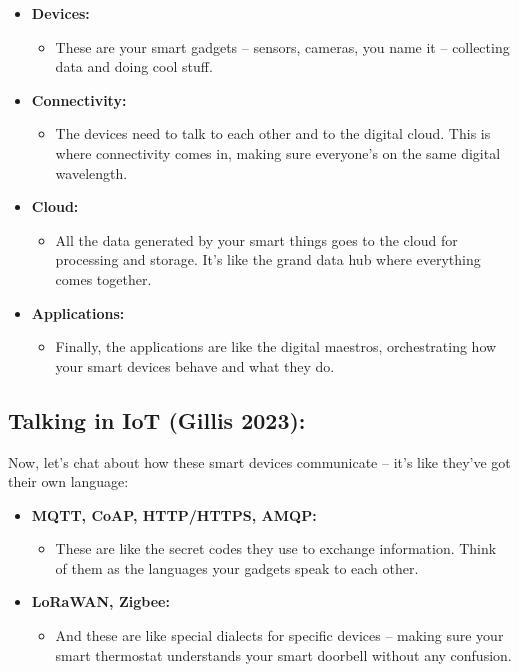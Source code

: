 \documentclass[
  letterpaper,
  DIV=11,
  numbers=noendperiod]{scrreprt}
\providecommand{\tightlist}{%
  \setlength{\itemsep}{0pt}\setlength{\parskip}{0pt}}\usepackage{longtable,booktabs,array}
\begin{document}
\begin{itemize}
\item
  \textbf{Devices:}

  \begin{itemize}
  \tightlist
  \item
    These are your smart gadgets -- sensors, cameras, you name it --
    collecting data and doing cool stuff.
  \end{itemize}
\item
  \textbf{Connectivity:}

  \begin{itemize}
  \tightlist
  \item
    The devices need to talk to each other and to the digital cloud.
    This is where connectivity comes in, making sure everyone's on the
    same digital wavelength.
  \end{itemize}
\item
  \textbf{Cloud:}

  \begin{itemize}
  \tightlist
  \item
    All the data generated by your smart things goes to the cloud for
    processing and storage. It's like the grand data hub where
    everything comes together.
  \end{itemize}
\item
  \textbf{Applications:}

  \begin{itemize}
  \tightlist
  \item
    Finally, the applications are like the digital maestros,
    orchestrating how your smart devices behave and what they do.
  \end{itemize}
\end{itemize}

\subsection{Talking in IoT (Gillis
2023):}\label{talking-in-iot-gillis2023iot}

Now, let's chat about how these smart devices communicate -- it's like
they've got their own language:

\begin{itemize}
\item
  \textbf{MQTT, CoAP, HTTP/HTTPS, AMQP:}

  \begin{itemize}
  \tightlist
  \item
    These are like the secret codes they use to exchange information.
    Think of them as the languages your gadgets speak to each other.
  \end{itemize}
\item
  \textbf{LoRaWAN, Zigbee:}

  \begin{itemize}
  \tightlist
  \item
    And these are like special dialects for specific devices -- making
    sure your smart thermostat understands your smart doorbell without
    any confusion.
  \end{itemize}
\end{itemize}
\end{document}
